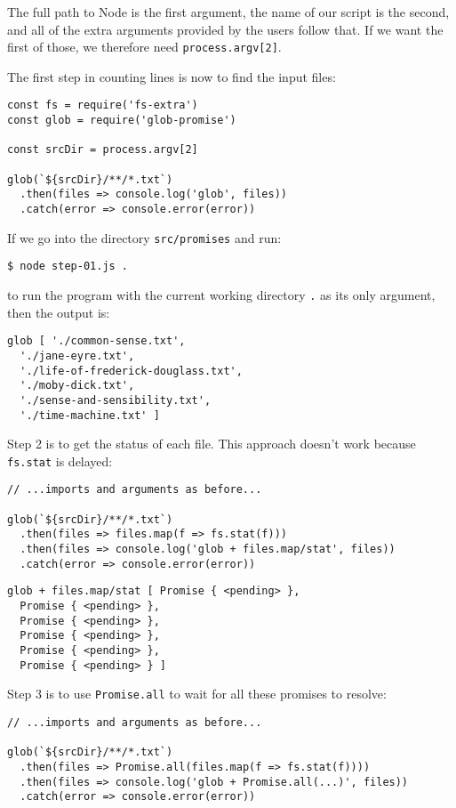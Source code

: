 \noindent
The full path to Node is the first argument,
the name of our script is the second,
and all of the extra arguments provided by the users follow that.
If we want the first of those,
we therefore need \texttt{process.argv[2]}.

The first step in counting lines is now to find the input files:

\begin{verbatim}
const fs = require('fs-extra')
const glob = require('glob-promise')

const srcDir = process.argv[2]

glob(`${srcDir}/**/*.txt`)
  .then(files => console.log('glob', files))
  .catch(error => console.error(error))
\end{verbatim}

\noindent
If we go into the directory \texttt{src/promises} and run:

\begin{verbatim}
$ node step-01.js .
\end{verbatim}

\noindent
to run the program with the current working directory \texttt{.} as its only argument,
then the output is:

\begin{verbatim}
glob [ './common-sense.txt',
  './jane-eyre.txt',
  './life-of-frederick-douglass.txt',
  './moby-dick.txt',
  './sense-and-sensibility.txt',
  './time-machine.txt' ]
\end{verbatim}

Step 2 is to get the status of each file.
This approach doesn't work because \texttt{fs.stat} is delayed:

\begin{verbatim}
// ...imports and arguments as before...

glob(`${srcDir}/**/*.txt`)
  .then(files => files.map(f => fs.stat(f)))
  .then(files => console.log('glob + files.map/stat', files))
  .catch(error => console.error(error))
\end{verbatim}

\begin{verbatim}
glob + files.map/stat [ Promise { <pending> },
  Promise { <pending> },
  Promise { <pending> },
  Promise { <pending> },
  Promise { <pending> },
  Promise { <pending> } ]
\end{verbatim}

Step 3 is to use \texttt{Promise.all} to wait for all these promises to resolve:

\begin{verbatim}
// ...imports and arguments as before...

glob(`${srcDir}/**/*.txt`)
  .then(files => Promise.all(files.map(f => fs.stat(f))))
  .then(files => console.log('glob + Promise.all(...)', files))
  .catch(error => console.error(error))
\end{verbatim}

